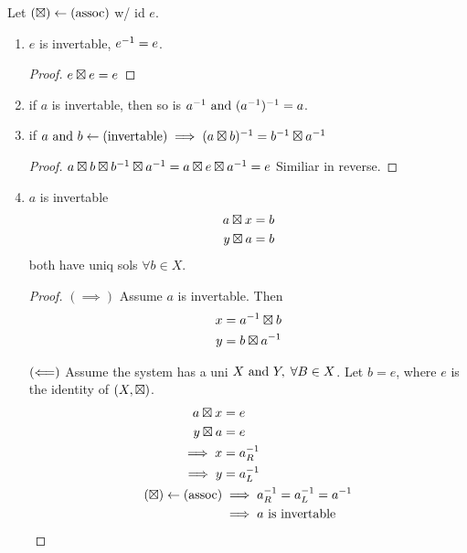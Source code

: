 \documentclass[12pt]{article}
\begin{document}
\bbox
\begin{lem}\label{lem:prop_of_inv}
  Let \((\boxtimes)\leftarrow(\mathrm{assoc})\) w/ id \(e\). 
  \begin{enumerate}
    \item \(e\) is invertable, \(e^{-1}=e\). \bboxproof\begin{proof} \(e\boxtimes e=e\)\end{proof}\ebox
    \item if \(a\) is invertable, then so is \(a^{-1}\text{ and } (a^{-1})^{-1}=a\).
    \item if \(a\text{ and } b\leftarrow(\mathrm{invertable})\implies(a\boxtimes b)^{-1}=b^{-1}\boxtimes a^{-1}\)
      \bboxproof
      \begin{proof}\(a\boxtimes b\boxtimes b^{-1}\boxtimes a^{-1}=a\boxtimes e\boxtimes a^{-1}=e\) 
        Similiar in reverse.
      \end{proof}
      \ebox
    \item \(a\) is invertable 
      \begin{equation*}
        \begin{split}
          a\boxtimes x&=b\\
          y\boxtimes a&=b
        \end{split}
      \end{equation*} both have uniq sols \(\forall b\in X\).
      \bboxproof
      \begin{proof}
        \((\implies)\) Assume \(a\) is invertable. Then
        \begin{equation*}
          \begin{split}
            x&=a^{-1}\boxtimes b\\
            y&=b\boxtimes a^{-1}
          \end{split}
        \end{equation*}

        \((\Longleftarrow)\) Assume the system has a uni \(X\text{ and } Y,\;\forall B\in X\).
        Let \(b=e\), where \(e\) is the identity of \((X,\boxtimes)\).
        \begin{equation*}
          \begin{split}
            a\boxtimes x&=e\\
            y\boxtimes a&=e\\
            \implies x&=a^{-1}_R\\
            \implies y&=a^{-1}_L\\
            (\boxtimes)\leftarrow(\mathrm{assoc})&\implies a^{-1}_R=a^{-1}_L=a^{-1}\\
                               &\implies a\text{ is invertable}
          \end{split}
        \end{equation*}
      \end{proof}
      \ebox
  \end{enumerate}
\end{lem}
\ebox
\end{document}
